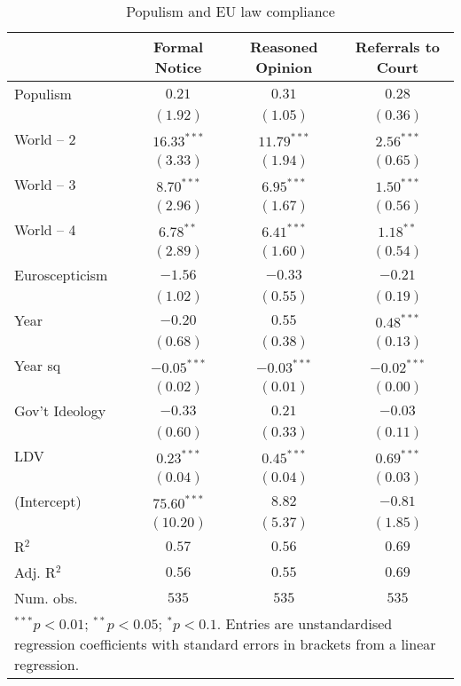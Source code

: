 
\begin{table}[htb]
\caption{Populism and EU law compliance}
\begin{center}
\begin{tabular}{l c c c}
\hline
 & Formal Notice & Reasoned Opinion & Referrals to Court \\
\hline
Populism       & $0.21$        & $0.31$        & $0.28$        \\
               & $(1.92)$      & $(1.05)$      & $(0.36)$      \\
World -- 2     & $16.33^{***}$ & $11.79^{***}$ & $2.56^{***}$  \\
               & $(3.33)$      & $(1.94)$      & $(0.65)$      \\
World -- 3     & $8.70^{***}$  & $6.95^{***}$  & $1.50^{***}$  \\
               & $(2.96)$      & $(1.67)$      & $(0.56)$      \\
World -- 4     & $6.78^{**}$   & $6.41^{***}$  & $1.18^{**}$   \\
               & $(2.89)$      & $(1.60)$      & $(0.54)$      \\
Euroscepticism & $-1.56$       & $-0.33$       & $-0.21$       \\
               & $(1.02)$      & $(0.55)$      & $(0.19)$      \\
Year           & $-0.20$       & $0.55$        & $0.48^{***}$  \\
               & $(0.68)$      & $(0.38)$      & $(0.13)$      \\
Year sq        & $-0.05^{***}$ & $-0.03^{***}$ & $-0.02^{***}$ \\
               & $(0.02)$      & $(0.01)$      & $(0.00)$      \\
Gov't Ideology & $-0.33$       & $0.21$        & $-0.03$       \\
               & $(0.60)$      & $(0.33)$      & $(0.11)$      \\
LDV            & $0.23^{***}$  & $0.45^{***}$  & $0.69^{***}$  \\
               & $(0.04)$      & $(0.04)$      & $(0.03)$      \\
(Intercept)    & $75.60^{***}$ & $8.82$        & $-0.81$       \\
               & $(10.20)$     & $(5.37)$      & $(1.85)$      \\
\hline
R$^2$          & $0.57$        & $0.56$        & $0.69$        \\
Adj. R$^2$     & $0.56$        & $0.55$        & $0.69$        \\
Num. obs.      & $535$         & $535$         & $535$         \\
\hline
\multicolumn{4}{l}{\scriptsize{\parbox{.7\linewidth}{$^{***}p<0.01$; $^{**}p<0.05$; $^{*}p<0.1$. Entries are unstandardised regression coefficients with standard errors in brackets from a linear regression.}}}
\end{tabular}
\label{t:pop}
\end{center}
\end{table}

